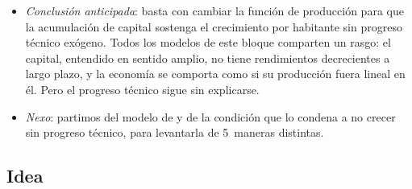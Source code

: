 \documentclass[11pt]{article}
\begin{document}
\begin{itemize}
\item \emph{Conclusión anticipada}: basta con cambiar la función de producción para que la acumulación de capital sostenga el crecimiento por habitante sin progreso técnico exógeno. Todos los modelos de este bloque comparten un rasgo: el capital, entendido en sentido amplio, no tiene rendimientos decrecientes a largo plazo, y la economía se comporta como si su producción fuera lineal en él. Pero el progreso técnico sigue sin explicarse.
\item \emph{Nexo}: partimos del modelo de  y de la condición que lo condena a no crecer sin progreso técnico, para levantarla de 5~maneras distintas.
\end{itemize}

\subsection{Idea}\label{sec:pg-idea}
\end{document}
